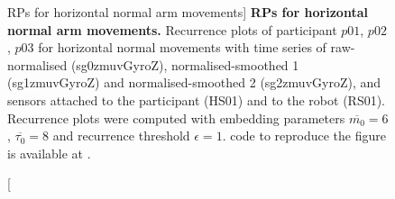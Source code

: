 \begin{figure}
\caption
	[RPs for horizontal normal arm movements]{
	{\bf RPs for horizontal normal arm movements.}	
	Recurrence plots %
	of participant $p01$, $p02$, $p03$ for horizontal normal 
	movements with time series of raw-normalised (sg0zmuvGyroZ), 
	normalised-smoothed 1 (sg1zmuvGyroZ) and 
	normalised-smoothed 2 (sg2zmuvGyroZ), and 
	sensors attached to the participant (HS01) and to the robot (RS01).
	Recurrence plots were computed with 
	embedding parameters $\overline{m_0}=6$, $\overline{\tau_0}=8$ and
	recurrence threshold $\epsilon=1$.
	\R code to reproduce the figure is available at 
	.
        }
    \label{fig:rp_HN}
\end{figure}



